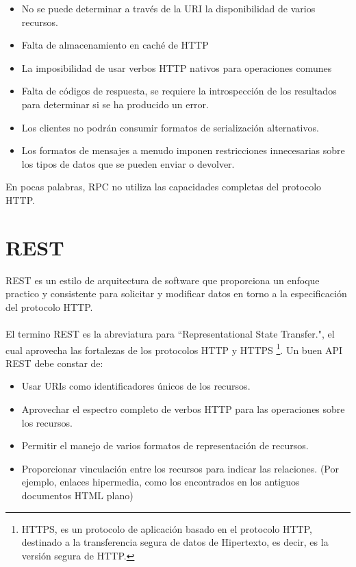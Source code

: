 \vspace{5mm}

\begin{itemize}
\item No se puede determinar a través de la URI la disponibilidad de varios recursos.
\item Falta de almacenamiento en caché de HTTP
\item La imposibilidad de usar verbos HTTP nativos para operaciones comunes 
\item Falta de códigos de respuesta, se requiere la introspección de los resultados para determinar si se ha producido un error.
\item Los clientes no podrán consumir formatos de serialización alternativos.
\item Los formatos de mensajes a menudo imponen restricciones innecesarias sobre los tipos de datos que se pueden enviar o devolver.
\end{itemize}

\vspace{5mm}

En pocas palabras, RPC no utiliza las capacidades completas del protocolo HTTP.

\section{REST}
REST es un estilo de arquitectura de software que proporciona un enfoque practico y consistente para solicitar y modificar datos en torno a la especificación del protocolo HTTP. \\
\\
El termino REST es la abreviatura para ``Representational State Transfer.", el cual aprovecha las fortalezas de los protocolos HTTP y HTTPS \footnote{HTTPS, es un protocolo de aplicación basado en el protocolo HTTP, destinado a la transferencia segura de datos de Hipertexto, es decir, es la versión segura de HTTP.}. Un buen API REST debe constar de:

\begin{itemize}
\item Usar URIs como identificadores únicos de los recursos.
\item Aprovechar el espectro completo de verbos HTTP para las operaciones sobre los recursos.
\item Permitir el manejo de varios formatos de representación de recursos.
\item Proporcionar vinculación entre los recursos para indicar las relaciones. (Por ejemplo, enlaces hipermedia, como los encontrados en los antiguos documentos HTML plano)
\end{itemize}

